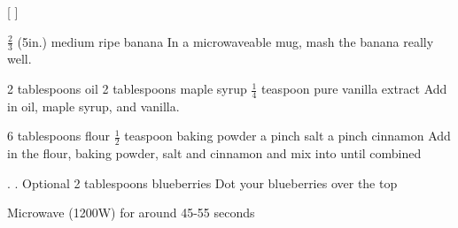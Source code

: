 [
]

\begin{step}
$\frac{2}{3}$ (5in.) medium ripe banana
\method
In a microwaveable mug, mash the banana really well.
\end{step}

\begin{step}
2 tablespoons oil
2 tablespoons maple syrup
$\frac{1}{4}$ teaspoon pure vanilla extract
\method
Add in oil, maple syrup, and vanilla.
\end{step}

\begin{step}
6 tablespoons flour
$\frac{1}{2}$ teaspoon baking powder
a pinch salt
a pinch cinnamon
\method
Add in the flour, baking powder, salt and cinnamon and mix into until combined
\end{step}

\begin{step}
. . Optional
2 tablespoons blueberries
\method
Dot your blueberries over the top

Microwave (1200W) for around 45-55 seconds
\end{step}